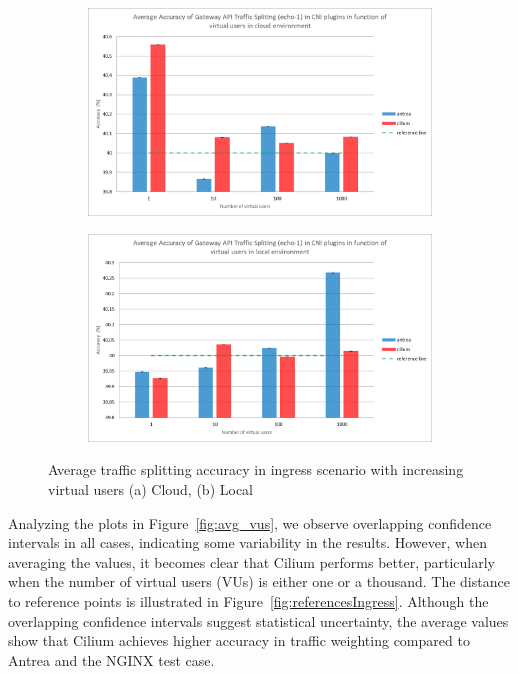 \begin{figure}[H]
    \centering
    \begin{subfigure}[b]{0.8\textwidth}
        \includegraphics[width=\textwidth]{plots/traffic-splitting/vus_cloud_all.png}
        \caption{}
        \label{fig:vus_cloud_avg}
    \end{subfigure}
    \begin{subfigure}[b]{0.8\textwidth}
        \includegraphics[width=\textwidth]{plots/traffic-splitting/vus_local_all.png}
        \caption{}
        \label{fig:vus_local_avg}
    \end{subfigure}
    
    \caption{Average traffic splitting accuracy in ingress scenario with increasing virtual users (a) Cloud, (b) Local}
    \label{fig:vus_avg}
\end{figure}


Analyzing the plots in Figure~\ref{fig:avg_vus}, we observe overlapping confidence intervals in all cases, indicating some variability in the results. However, when averaging the values, it becomes clear that Cilium performs better, particularly when the number of virtual users (VUs) is either one or a thousand. The distance to reference points is illustrated in Figure~\ref{fig:referencesIngress}. Although the overlapping confidence intervals suggest statistical uncertainty, the average values show that Cilium achieves higher accuracy in traffic weighting compared to Antrea and the NGINX test case.


